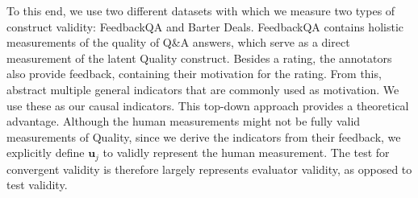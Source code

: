 To this end, we use two different datasets with which we measure two types of construct validity: FeedbackQA \citep{li_using_2022} and Barter Deals. FeedbackQA contains holistic measurements of the quality of Q\&A answers, which serve as a direct measurement of the latent Quality construct. Besides a rating, the annotators also provide feedback, containing their motivation for the rating. From this, \citet{li_using_2022} abstract multiple general indicators that are commonly used as motivation. We use these as our causal indicators. This top-down approach provides a theoretical advantage. Although the human measurements might not be fully valid measurements of Quality, since we derive the indicators from their feedback, we explicitly define $\mathbf{u}_j$ to validly represent the human measurement. The test for convergent validity is therefore largely represents evaluator validity, as opposed to test validity. 







